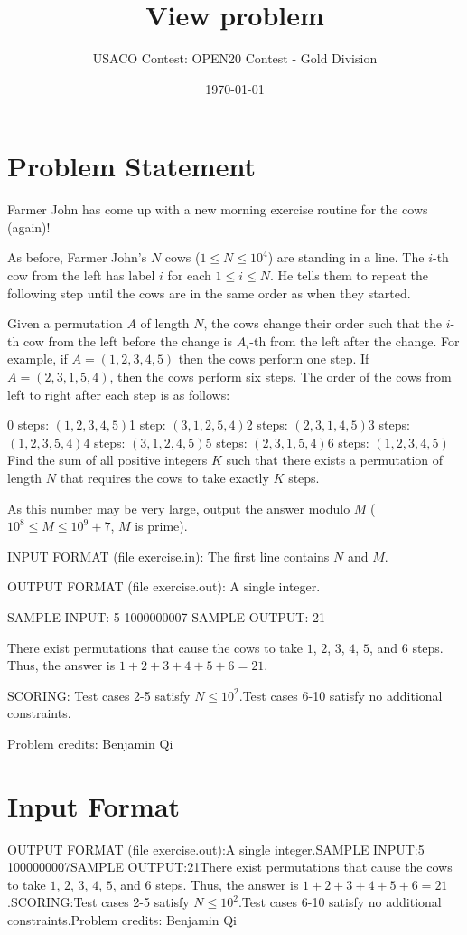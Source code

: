 \documentclass[12pt]{article}
\title{View problem}
\author{USACO Contest: OPEN20 Contest - Gold Division}
\date{\today}
\begin{document}
\maketitle

\section*{Problem Statement}

Farmer John has come up with a new morning exercise routine for the cows
(again)!

As before, Farmer John's $N$ cows ($1\le N\le 10^4$) are standing in a line. 
The $i$-th cow from the left has label $i$ for each $1\le i\le N$. He tells them
to repeat the following step until the cows are in the same order as when they
started.

Given a permutation $A$ of length $N$, the cows change their order such that
the $i$-th cow from the left before the change is $A_i$-th from the left after
the change. 
For example, if $A=(1,2,3,4,5)$ then the cows perform one step. If 
$A=(2,3,1,5,4)$, then the cows perform six steps. The order of the cows from
left to right after each step is as follows:

0 steps: $(1,2,3,4,5)$1 step: $(3,1,2,5,4)$2 steps: $(2,3,1,4,5)$3 steps: $(1,2,3,5,4)$4 steps: $(3,1,2,4,5)$5 steps: $(2,3,1,5,4)$6 steps: $(1,2,3,4,5)$
Find the sum of all positive integers $K$ such that there exists a permutation
of length $N$ that requires the cows to take exactly $K$ steps. 

As this number may be very large, output the answer modulo $M$
($10^8\le M\le 10^9+7$, $M$ is prime).

INPUT FORMAT (file exercise.in):
The first line contains $N$ and $M$.

OUTPUT FORMAT (file exercise.out):
A single integer.

SAMPLE INPUT:
5 1000000007
SAMPLE OUTPUT: 
21

There exist permutations that cause the cows to take $1$, $2$, $3$, $4$, $5$,
and $6$ steps. Thus, the answer is $1+2+3+4+5+6=21$.

SCORING:
Test cases 2-5 satisfy $N\le 10^2$.Test cases 6-10 satisfy no additional constraints.


Problem credits: Benjamin Qi



\section*{Input Format}
OUTPUT FORMAT (file exercise.out):A single integer.SAMPLE INPUT:5 1000000007SAMPLE OUTPUT:21There exist permutations that cause the cows to take $1$, $2$, $3$, $4$, $5$,
and $6$ steps. Thus, the answer is $1+2+3+4+5+6=21$.SCORING:Test cases 2-5 satisfy $N\le 10^2$.Test cases 6-10 satisfy no additional constraints.Problem credits: Benjamin Qi
\end{document}
